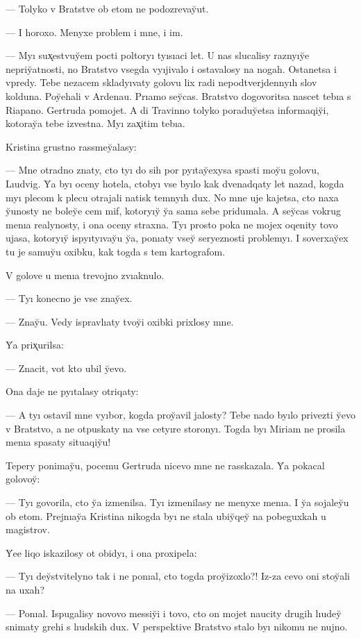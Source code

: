 \documentclass[10pt]{book}
\begin{document}
— Tolyko v Bratstve ob etom ne podozrevay̆ut.

— I horoxo. Menyxe problem i mne, i im.

— Myı sux̨estvuy̆em pocti poltoryı tyısıaci let. U nas slucalisy raznyıy̆e nepriy̆atnosti, no Bratstvo vsegda vyıjivalo i ostavalosy na nogah. Ostanetsa i vpredy. Tebe nezacem skladyıvaty golovu lix radi nepodtverjdennyıh slov kolduna. Poy̆ehali v Ardenau. Prıamo sey̆cas. Bratstvo dogovoritsa nascet tebıa s Riapano. Gertruda pomojet. A di Travinno tolyko poraduy̆etsa informaqiy̆i, kotoray̆a tebe izvestna. Myı zax̨itim tebıa.

Kristina grustno rassmey̆alasy:

— Mne otradno znaty, cto tyı do sih por pyıtay̆exysa spasti moy̆u golovu, Lıudvig. Y̆a byı oceny hotela, ctobyı vse byılo kak dvenadqaty let nazad, kogda myı plecom k plecu otrajali natisk temnyıh dux. No mne uje kajetsa, cto naxa y̆unosty ne boley̆e cem mif, kotoryıy̆ y̆a sama sebe pridumala. A sey̆cas vokrug menıa realynosty, i ona oceny straxna. Tyı prosto poka ne mojex oqenity tovo ujasa, kotoryıy̆ ispyıtyıvay̆u y̆a, ponıaty vsey̆ seryeznosti problemyı. I soverxay̆ex tu je samuy̆u oxibku, kak togda s tem kartografom.

V golove u menıa trevojno zvıaknulo.

— Tyı konecno je vse znay̆ex.

— Znay̆u. Vedy ispravlıaty tvoy̆i oxibki prixlosy mne.

Y̆a prix̨urilsa:

— Znacit, vot kto ubil y̆evo.

Ona daje ne pyıtalasy otriqaty:

— A tyı ostavil mne vyıbor, kogda proy̆avil jalosty? Tebe nado byılo privezti y̆evo v Bratstvo, a ne otpuskaty na vse cetyıre storonyı. Togda byı Miriam ne prosila menıa spasaty situaqiy̆u!

Tepery ponimay̆u, pocemu Gertruda nicevo mne ne rasskazala. Y̆a pokacal golovoy̆:

— Tyı govorila, cto y̆a izmenilsa. Tyı izmenilasy ne menyxe menıa. I y̆a sojaley̆u ob etom. Prejnıay̆a Kristina nikogda byı ne stala ubiy̆qey̆ na pobeguxkah u magistrov.

Y̆ee liqo iskazilosy ot obidyı, i ona proxipela:

— Tyı dey̆stvitelyno tak i ne ponıal, cto togda proy̆izoxlo?! Iz-za cevo oni stoy̆ali na uxah?

— Ponıal. Ispugalisy novovo messiy̆i i tovo, cto on mojet naucity drugih lıudey̆ snimaty grehi s lıudskih dux. V perspektive Bratstvo stalo byı nikomu ne nujno.
\end{document}

